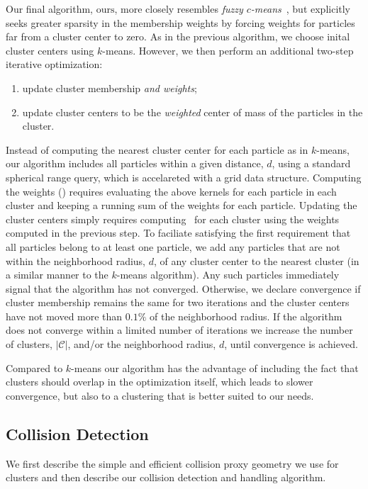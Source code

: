 \documentclass[review]{acmsiggraph}
\begin{document}
Our final algorithm, $\mathrm{ours}$, more closely resembles {\em fuzzy $c$-means}~\cite{Dunn:1973:AFR,Bezdek:1981:PRF}, 
but explicitly seeks greater sparsity in the membership weights by forcing
weights for particles far from a cluster center to zero.  As in the previous algorithm, we choose inital cluster centers using $k$-means.
However, we then perform an additional two-step iterative optimization:
\begin{enumerate}
\item update cluster membership {\em and weights};
\item update cluster centers to be the {\em weighted} center of mass of the particles in the cluster.
\end{enumerate}
Instead of computing the nearest cluster center for each particle as in $k$-means, our algorithm includes all particles within a given distance, 
$d$, using a standard spherical range query, which is accelareted with a grid data structure.  Computing the weights 
() requires evaluating the above 
kernels for each particle in each cluster and keeping a running sum of the weights for each particle.  Updating the cluster centers simply requires 
computing~ for each cluster using the weights computed in the previous step.  To faciliate satisfying the first requirement that 
all particles belong to at least one particle, we add any particles that are not within the neighborhood radius, $d$, of 
any cluster center to the nearest cluster 
(in a similar manner to the $k$-means algorithm).  Any such particles immediately signal that the algorithm has not converged.  Otherwise,
we declare convergence if cluster membership remains the same for two iterations and the cluster centers have not moved more than $0.1\%$ of the neighborhood radius.   
If the algorithm
does not converge within a limited number of iterations we increase the number of clusters, $|\mathcal{C}|$, and/or the neighborhood radius, $d$, until convergence is achieved.

Compared to $k$-means our algorithm has the advantage of including the fact that clusters should overlap in the optimization itself, which leads to slower convergence, but
also to a clustering that is better suited to our needs.

\subsection{Collision Detection}
We first describe the simple and efficient collision proxy geometry we use for clusters and then describe
our collision detection and handling algorithm.
\end{document}
